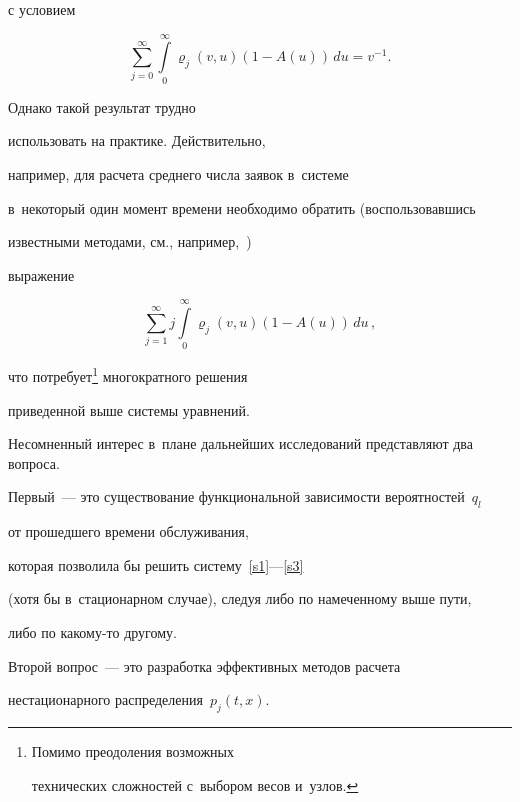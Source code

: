 с условием 

$$

\sum\limits_{j=0}^\infty \int\limits_0^\infty \varrho_j(v,u) (1-A(u)) 

\,du=v^{-1}.

$$



Однако такой результат трудно

использовать на практике. Действительно,

например, для расчета среднего чис\-ла заявок в~сис\-те\-ме 

в~некоторый один момент времени необходимо обратить (воспользовавшись

известными методами, см., например,~\cite{Abate,Abate1})

выражение 

$$

\sum\limits_{j=1}^\infty j \int\limits_0^\infty  \varrho_j(v,u)  (1-A(u)) \,du\,,

$$

что потребует\footnote{Помимо преодоления возможных

технических сложностей с~выбором весов и~узлов.} многократного решения 

приведенной выше сис\-те\-мы уравнений.



Несомненный интерес в~плане дальнейших исследований представляют два вопроса.

Первый~--- это существование функциональной зависимости вероятностей~$q_l$

от прошедшего времени обслуживания,

которая позволила бы решить сис\-те\-му~\eqref{s1}---\eqref{s3}

(хотя бы в~стационарном случае), сле\-дуя либо по намеченному выше пути,

либо по ка\-ко\-му-то другому.

Второй вопрос~--- это разработка эффективных методов расчета

нестационарного распределения~${p_j(t,x)}$.








